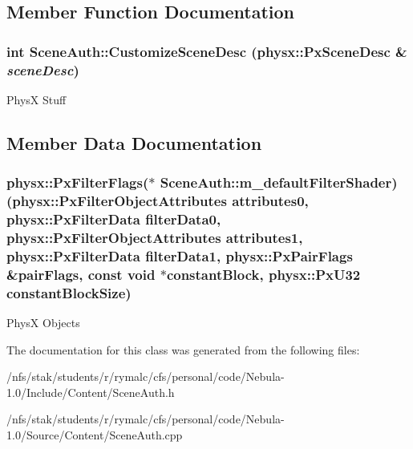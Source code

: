 \subsection{Member Function Documentation}
\hypertarget{classSceneAuth_ac61436be3715d7086fd1bf2bf7aa91e3}{
\subsubsection[{CustomizeSceneDesc}]{\setlength{\rightskip}{0pt plus 5cm}int SceneAuth::CustomizeSceneDesc (physx::PxSceneDesc \& {\em sceneDesc})}}
\label{classSceneAuth_ac61436be3715d7086fd1bf2bf7aa91e3}
PhysX Stuff 

\subsection{Member Data Documentation}
\hypertarget{classSceneAuth_af2cc65840cdc6b21a7648cb63cd65437}{
\subsubsection[{m\_\-defaultFilterShader}]{\setlength{\rightskip}{0pt plus 5cm}physx::PxFilterFlags($\ast$ {\bf SceneAuth::m\_\-defaultFilterShader})(physx::PxFilterObjectAttributes attributes0, physx::PxFilterData filterData0, physx::PxFilterObjectAttributes attributes1, physx::PxFilterData filterData1, physx::PxPairFlags \&pairFlags, const void $\ast$constantBlock, physx::PxU32 constantBlockSize)}}
\label{classSceneAuth_af2cc65840cdc6b21a7648cb63cd65437}
PhysX Objects 

The documentation for this class was generated from the following files:\begin{DoxyCompactItemize}
\item 
/nfs/stak/students/r/rymalc/cfs/personal/code/Nebula-\/1.0/Include/Content/SceneAuth.h\item 
/nfs/stak/students/r/rymalc/cfs/personal/code/Nebula-\/1.0/Source/Content/SceneAuth.cpp\end{DoxyCompactItemize}
